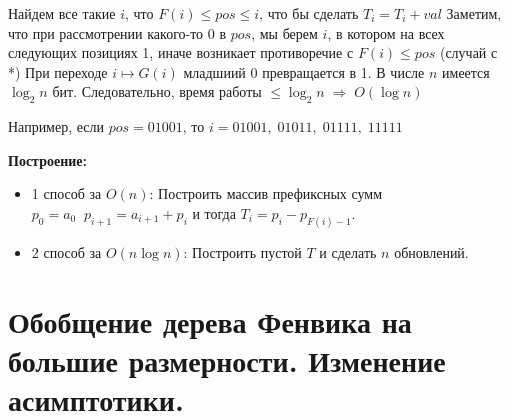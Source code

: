 \begin{minipage}{0.7\textwidth}
\vspace{2ex}
  \begin{flushright}
    Найдем все такие $i$, что $F(i) \leq pos \leq i$, что бы сделать $T_i =T_i + val$
	\newline Заметим, что при рассмотрении какого-то 0 в $pos$, мы берем $i$, в котором на всех следующих позициях 1, иначе возникает противоречие с $F(i) \leq pos$ (случай с *)
	\newline При переходе $i \mapsto G(i)$ младшиий 0 превращается в 1.
	\newline В числе $n$ имеется $\log_{2}{n}$ бит. Следовательно, время работы $\leq \log_{2}{n} \; \Rightarrow \; O(\log n)$
  \end{flushright}
\end{minipage}
Например, если $pos=01001$, то $i = 01001, \; 01011, \; 01111, \; 11111$
\par \textbf{Построение:} 
\begin{itemize}
    \item 1 способ за $O(n)$: Построить массив префиксных сумм $p_0=a_0 \;\; p_{i+1}=a_{i+1}+p_i$ и тогда $T_i = p_i - p_{F(i)-1}$.
    \item 2 способ за $O(n\log n)$: Построить пустой $T$ и сделать $n$ обновлений.
\end{itemize}


\newpage
\setcounter{section}{70}
\section{Обобщение дерева Фенвика на большие размерности. Изменение асимптотики. }

